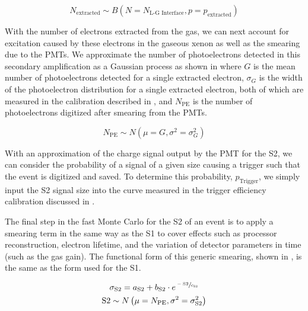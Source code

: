 \begin{equation}
        \label{eqn:nerix_binomial_ee}
        N_{\textrm{extracted}} \sim B \left( N= N_{\textrm{L-G Interface}}, p=p_{\textrm{extracted}} \right)
\end{equation}


With the number of electrons extracted from the gas, we can next account for excitation caused by these electrons in the gaseous xenon as well as the smearing due to the PMTs.  We approximate the number of photoelectrons detected in this secondary amplification as a Gaussian process as shown in  where $G$ is the mean number of photoelectrons detected for a single extracted electron, $\sigma_G$ is the width of the photoelectron distribution for a single extracted electron, both of which are measured in the calibration described in , and $N_{\textrm{PE}}$ is the number of photoelectrons digitized after smearing from the PMTs.

\begin{equation}
        \label{eqn:nerix_gas_gain}
        N_{\textrm{PE}} \sim N(\mu=G , \sigma^2=\sigma_G^2)
\end{equation}


With an approximation of the charge signal output by the PMT for the S2, we can consider the probability of a signal of a given size causing a trigger such that the event is digitized and saved.  To determine this probability, $p_{\textrm{Trigger}}$, we simply input the S2 signal size into the curve measured in the trigger efficiency calibration discussed in .

The final step in the fast Monte Carlo for the S2 of an event is to apply a smearing term in the same way as the S1 to cover effects such as processor reconstruction, electron lifetime, and the variation of detector parameters in time (such as the gas gain).  The functional form of this generic smearing, shown in , is the same as the form used for the S1.


\begin{equation}
        \label{eqn:nerix_s2_smearing}
        \begin{gathered}
                \sigma_{\textrm{S2}} = a_{\textrm{S2}} + b_{\textrm{S2}} \cdot e^{\sfrac{-\textrm{S2}}{c_{\textrm{S2}}}} \\
                \textrm{S2} \sim N \left( \mu = N_{\textrm{PE}}, \sigma^2  = \sigma_{\textrm{S2}}^2 \right)
        \end{gathered}
\end{equation}


